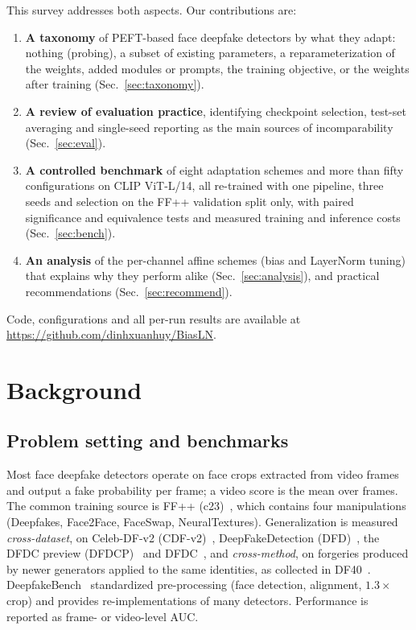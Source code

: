 \documentclass[fonts]{icst}
\begin{document}
This survey addresses both aspects. Our contributions are:
\begin{enumerate}
    \item \textbf{A taxonomy} of PEFT-based face deepfake detectors by what they adapt: nothing (probing), a subset of existing parameters, a reparameterization of the weights, added modules or prompts, the training objective, or the weights after training (Sec.~\ref{sec:taxonomy}).
    \item \textbf{A review of evaluation practice}, identifying checkpoint selection, test-set averaging and single-seed reporting as the main sources of incomparability (Sec.~\ref{sec:eval}).
    \item \textbf{A controlled benchmark} of eight adaptation schemes and more than fifty configurations on CLIP ViT-L/14, all re-trained with one pipeline, three seeds and selection on the FF++ validation split only, with paired significance and equivalence tests and measured training and inference costs (Sec.~\ref{sec:bench}).
    \item \textbf{An analysis} of the per-channel affine schemes (bias and LayerNorm tuning) that explains why they perform alike (Sec.~\ref{sec:analysis}), and practical recommendations (Sec.~\ref{sec:recommend}).
\end{enumerate}
Code, configurations and all per-run results are available at \href{https://github.com/dinhxuanhuy/BiasLN}{https://github.com/dinhxuanhuy/BiasLN}.

\section{Background}
\label{sec:background}

\subsection{Problem setting and benchmarks}
Most face deepfake detectors operate on face crops extracted from video frames and output a fake probability per frame; a video score is the mean over frames. The common training source is FF++ (c23)~\cite{rossler2019ff}, which contains four manipulations (Deepfakes, Face2Face, FaceSwap, NeuralTextures). Generalization is measured \emph{cross-dataset}, on Celeb-DF-v2 (CDF-v2)~\cite{li2020celeb}, DeepFakeDetection (DFD)~\cite{dufour2019dfd}, the DFDC preview (DFDCP)~\cite{dolhansky2019dfdcp} and DFDC~\cite{dolhansky2020dfdc}, and \emph{cross-method}, on forgeries produced by newer generators applied to the same identities, as collected in DF40~\cite{yan2024df40}. DeepfakeBench~\cite{yan2023deepfakebench} standardized pre-processing (face detection, alignment, $1.3\times$ crop) and provides re-implementations of many detectors. Performance is reported as frame- or video-level AUC.
\end{document}
